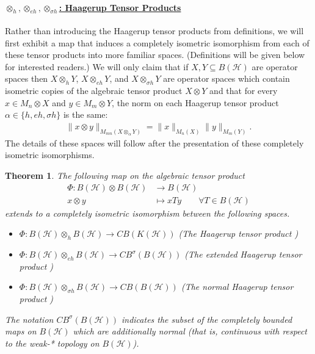 \documentclass[12pt]{article}
\newtheorem{theorem}{Theorem}[section]
\theoremstyle{definition}
\newcommand{\mc}[1]{\mathcal{#1}}
\newcommand{\<}{\langle}
\renewcommand{\>}{\rangle}
\renewcommand{\subset}{\subseteq}
\newcommand{\eh}{\otimes_{eh}}
\newcommand{\h}{\otimes_{h}}
\begin{document}
\paragraph{\underline{$\h, \eh, \otimes _{\sigma h}$: Haagerup Tensor Products}} 

Rather than introducing the Haagerup tensor products from definitions, we will first exhibit a map that induces a completely isometric isomorphism from each of these tensor products into more familiar spaces. (Definitions will be given below for interested readers.) We will only claim that if $X, Y \subset B(\mc H)$ are operator spaces then $X \otimes_h Y$, $X \eh Y$, and $X \otimes_{\sigma h} Y$ are operator spaces which contain isometric copies of the algebraic tensor product $X \otimes Y$ and that for every $x \in M_n \otimes X$ and $y \in M_m \otimes Y$, the norm on each Haagerup tensor product $\alpha \in \{h,eh,\sigma h\}$ is the same:
\begin{align}
\|x \otimes y\|_{M_{mn}(X \otimes_\alpha Y)} = \|x \|_{M_n(X)} \|y\|_{M_m(Y)}.
\end{align}
The details of these spaces will follow after the presentation of these completely isometric isomorphisms.

\begin{theorem} \label{defn: Phi-map}
    The following map on the algebraic tensor product
    \begin{align*}
    \Phi : B(\mc H) \otimes B(\mc H) &\to B(\mc H) \\
    x \otimes y &\mapsto xTy \qquad \forall T \in B(\mc H)
    \end{align*}
    extends to a completely isometric isomorphism between the following spaces.
    \begin{itemize}
        \item $\Phi: B(\mc H) \otimes_h B(\mc H) \to CB (K(\mc H))$ (The Haagerup tensor product \cite[Theorem 4.3]{haagerup-smith}) 
        \item $\Phi: B(\mc H) \otimes_{eh} B(\mc H) \to CB^\sigma(B(\mc H))$ (The extended Haagerup tensor product \cite[Proposition 2.1]{blecher-smith-w*h}) 
        \item $\Phi: B(\mc H) \otimes_{\sigma h} B(\mc H) \to CB (B(\mc H))$ (The normal Haagerup tensor product \cite[Theorem 2.5]{normal-haagerup}) 
    \end{itemize}
    The notation $CB^\sigma(B(\mc H))$ indicates the subset of the completely bounded maps on $B(\mc H)$ which are additionally normal (that is, continuous with respect to the weak-* topology on $B(\mc H)$).
\end{theorem}
\end{document}
